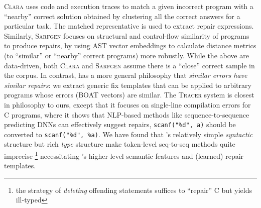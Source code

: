 %
\textsc{Clara} \citep{Gulwani_2018} uses code and execution traces 
to match a given incorrect program with a ``nearby'' correct solution 
obtained by clustering all the correct answers for a particular task.
The matched representative is used to extract repair expressions. 
%
Similarly, \textsc{Sarfgen} \citep{Wang_2018} focuses on structural 
and control-flow similarity of programs to produce repairs, by using 
AST vector embeddings to calculate distance metrics (to ``similar'' 
or ``nearby'' correct programs) more robustly.
%
While the above are data-driven, both \textsc{Clara} and \textsc{Sarfgen} 
assume there is a ``close'' correct sample in the corpus. 
%
In contrast, \toolname has a more general philosophy that 
\emph{similar errors have similar repairs}: we extract 
generic fix templates that can be applied to arbitrary 
programs whose errors (BOAT vectors) are similar.
%
The \textsc{Tracer} system \cite{TRACER2018} is closest 
in philosophy to ours, except that it focuses on single-line 
compilation errors for C programs, where it shows that 
NLP-based methods like sequence-to-sequence predicting 
DNNs can effectively suggest repairs, \eg \verb+scanf("%d", a)+ 
should be converted to \verb+scanf("%d", %a)+. 
%
We have found that \ocaml's relatively simple 
\emph{syntactic} structure but rich \emph{type} 
structure make token-level seq-to-seq methods 
quite imprecise \footnote{the strategy of 
\emph{deleting} offending statements 
suffices to ``repair'' C but yields ill-typed 
\ocaml} necessitating \toolname's higher-level 
semantic features and (learned) repair templates.


%
% 

